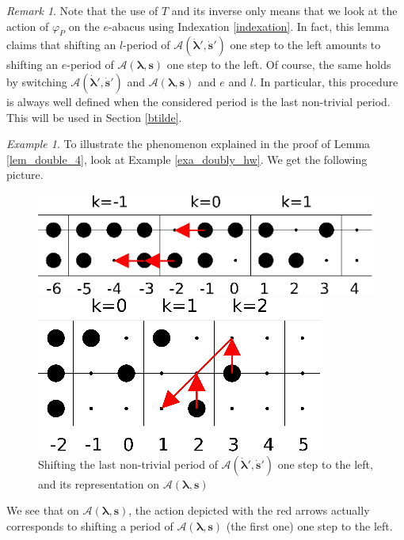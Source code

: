 \documentclass[twoside,12pt]{amsart}
\theoremstyle{plain}
\newcommand{\cA}{\mathcal{A}}
\newcommand{\bs}{\mathbf{s}}
\newcommand{\la}{\lambda}
\newcommand{\bla}{\boldsymbol{\la}}
\newcommand{\dbs}{\dot{\bs}}
\newcommand{\dbla}{\dot{\bla}}
\theoremstyle{remark}
\newtheorem{exa}[num]{Example}
\newtheorem{rem}[num]{Remark}
\begin{document}
\begin{rem}
Note that the use of $T$ and its inverse only means that 
we look at the action of $\varphi_{P}$ on the $e$-abacus using Indexation \ref{indexation}.
In fact, this lemma claims that 
shifting an $l$-period of $\cA(\dbla',\dbs')$ one step to the left amounts to
shifting an $e$-period of $\cA(\bla,\bs)$ one step to the left.
Of course, the same holds by switching $\cA(\dbla',\dbs')$ and $\cA(\bla,\bs)$ and $e$ and $l$.
In particular, this procedure is always well defined when the considered period is the last non-trivial period.
This will be used in Section \ref{btilde}.
\end{rem}



\begin{exa}\label{exa_shift_period}
To illustrate the phenomenon explained in the proof of Lemma \ref{lem_double_4},
look at Example \ref{exa_doubly_hw}.
We get the following picture.
\begin{figure}[H] 
\includegraphics{images/abaque17.eps}

\vspace{0.5cm}

\includegraphics{images/abaque18.eps}
\caption{Shifting the last non-trivial period of $\cA(\dbla',\dbs')$ one step to the left,
and its representation on $\cA(\bla,\bs)$}
\label{ab18}
\end{figure}
We see that on $\cA(\bla,\bs)$, the action depicted with the red arrows actually
corresponds to shifting a period of $\cA(\bla,\bs)$ (the first one) one step to the left.
\end{exa}
\end{document}
